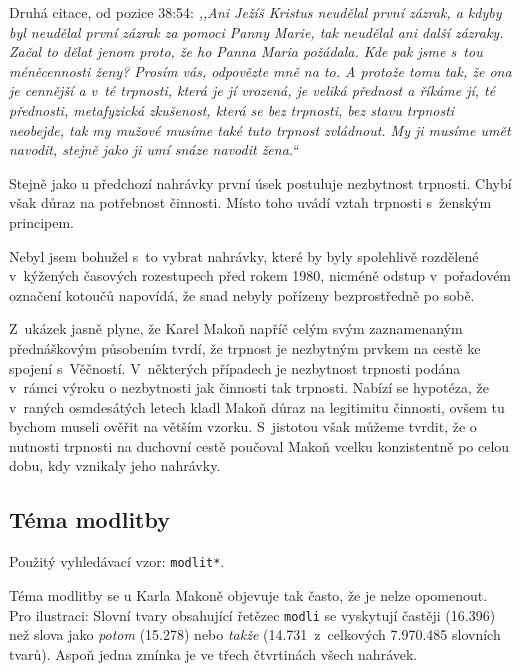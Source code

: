 \begin{enumerate}
{      Druhá citace, od pozice 38:54: \textit{%
        ,,Ani Ježíš Kristus neudělal první zázrak, a kdyby byl neudělal první
        zázrak za pomoci Panny Marie, tak neudělal ani další zázraky. Začal to
        dělat jenom proto, že ho Panna Maria požádala. Kde pak jsme s~tou
        méněcennosti ženy? Prosím vás, odpovězte mně na to. A protože tomu tak,
        že ona je cennější a v~té trpnosti, která je jí vrozená, je veliká
        přednost a říkáme jí, té přednosti, metafyzická zkušenost, která se bez
        trpnosti, bez stavu trpnosti neobejde, tak my mužové musíme také tuto
        trpnost zvládnout. My ji musíme umět navodit, stejně jako ji umí snáze
        navodit žena.``
      }

      Stejně jako u předchozí nahrávky první úsek postuluje nezbytnost trpnosti.
      Chybí však důraz na potřebnost činnosti. Místo toho uvádí vztah trpnosti
      s~ženským principem.
  }
\end{enumerate}

Nebyl jsem bohužel s~to vybrat nahrávky, které by byly spolehlivě rozdělené
v~kýžených časových rozestupech před rokem 1980, nicméně odstup v~pořadovém
označení kotoučů napovídá, že snad nebyly pořízeny bezprostředně po sobě.

Z~ukázek jasně plyne, že Karel Makoň napříč celým svým zaznamenaným přednáškovým
působením tvrdí, že trpnost je nezbytným prvkem na cestě ke spojení s~Věčností.
V~některých případech je nezbytnost trpnosti podána v~rámci výroku o nezbytnosti
jak činnosti tak trpnosti. Nabízí se hypotéza, že v~raných osmdesátých letech
kladl Makoň důraz na legitimitu činnosti, ovšem tu bychom museli ověřit na
větším vzorku. S~jistotou však můžeme tvrdit, že o nutnosti trpnosti na duchovní
cestě poučoval Makoň vcelku konzistentně po celou dobu, kdy vznikaly jeho nahrávky.

\subsection{Téma modlitby}

Použitý vyhledávací vzor: \texttt{modlit*}.

Téma modlitby se u Karla Makoně objevuje tak často, že je nelze opomenout. Pro
ilustraci: Slovní tvary obsahující řetězec \texttt{modli} se vyskytují častěji
(16.396\texttimes) než slova jako \textit{potom} (15.278\texttimes) nebo
  \textit{takže} (14.731\texttimes~z~celkových 7.970.485 slovních tvarů). Aspoň
jedna zmínka je ve třech čtvrtinách všech nahrávek.


